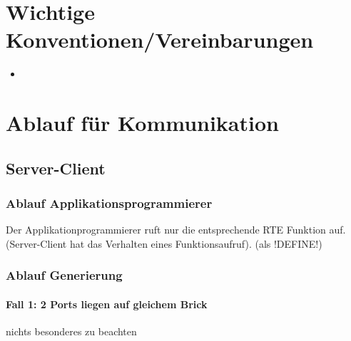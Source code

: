 \documentclass[]{scrartcl}
\begin{document}
\section{Wichtige Konventionen/Vereinbarungen}
\begin{itemize}
\item 
\end{itemize}

\section{Ablauf für Kommunikation}
\subsection{Server-Client}
\subsubsection{Ablauf Applikationsprogrammierer}
Der Applikationprogrammierer ruft nur die entsprechende RTE Funktion auf.(Server-Client hat das Verhalten eines Funktionsaufruf).
(als !DEFINE!)
\subsubsection{Ablauf Generierung}
\paragraph{Fall 1: 2 Ports liegen auf gleichem Brick}
nichts besonderes zu beachten
\end{document}
